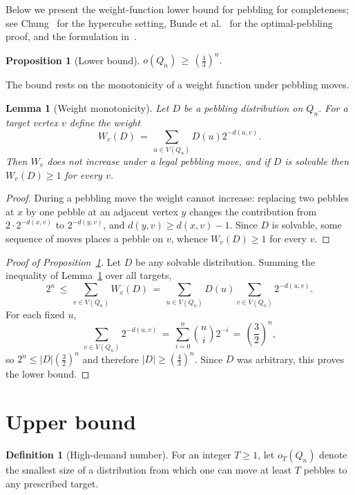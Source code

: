 \documentclass[11pt]{article}
\theoremstyle{plain}
\newtheorem{lemma}[theorem]{Lemma}
\newtheorem{proposition}[theorem]{Proposition}
\theoremstyle{definition}
\newtheorem{definition}[theorem]{Definition}
\begin{document}
Below we present the weight-function lower bound for pebbling for completeness; see
Chung~\cite{Chung} for the hypercube setting, Bunde et al.~\cite{BundeEtAl} for the
optimal-pebbling proof, and the formulation in~\cite{Hurlbert}.

\begin{proposition}[Lower bound]\label{prop:lower}
$o(Q_n)\,\ge\,\left(\frac43\right)^n.$
\end{proposition}

The bound rests on the monotonicity of a weight function under pebbling moves.

\begin{lemma}[Weight monotonicity]\label{lem:weight}
Let $D$ be a pebbling distribution on $Q_n$.  For a target vertex $v$ define the weight
\[
W_v(D)\,=\,\sum_{u\in V(Q_n)} D(u)2^{-d(u,v)}.
\]
Then $W_v$ does not increase under a legal pebbling move, and if $D$ is solvable then
$W_v(D)\ge 1$ for every $v$.
\end{lemma}
\begin{proof}
During a pebbling move the weight cannot increase: replacing two pebbles at $x$ by one
pebble at an adjacent vertex $y$ changes the contribution from $2\cdot 2^{-d(x,v)}$ to
$2^{-d(y,v)}$, and $d(y,v)\ge d(x,v)-1$.  Since $D$ is solvable, some sequence of moves
places a pebble on $v$, whence $W_v(D)\ge 1$ for every $v$.
\end{proof}

\begin{proof}[Proof of Proposition~\ref{prop:lower}]
Let $D$ be any solvable distribution.  Summing the inequality of
Lemma~\ref{lem:weight} over all targets,
\[
2^n
\,\le\, \sum_{v\in V(Q_n)} W_v(D)
\,=\,\sum_{u\in V(Q_n)}D(u)\sum_{v\in V(Q_n)}2^{-d(u,v)}.
\]
For each fixed $u$,
\[
\sum_{v\in V(Q_n)}2^{-d(u,v)}
\,=\,\sum_{i=0}^n \binom ni2^{-i}
\,=\,\left(\frac32\right)^n,
\]
so $2^n\le |D|\left(\frac32\right)^n$ and therefore $|D|\ge \left(\frac43\right)^n$.  Since
$D$ was arbitrary, this proves the lower bound.
\end{proof}

\section*{Upper bound}

\begin{definition}[High-demand number]\label{def:demand}
For an integer $T\ge 1$, let $o_T(Q_n)$ denote the smallest size of a distribution from
which one can move at least $T$ pebbles to any prescribed target.
\end{definition}
\end{document}
